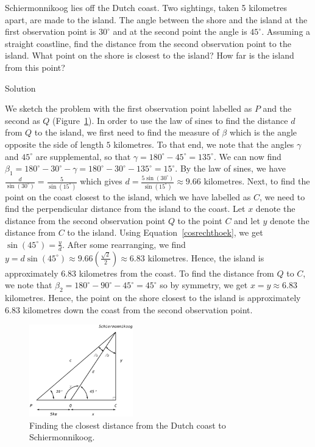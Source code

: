 \begin{example} \label{losapplication}

Schiermonnikoog lies off the Dutch coast.  Two sightings, taken 5 kilometres apart, are made to the island.  The angle between the shore and the island at the first observation point is $30^{\circ}$ and at the second point the angle is $45^{\circ}$.  Assuming a straight coastline, find the distance from the second observation point to the island.  What point on the shore is closest to the island? How far is the island from this point?  

Solution 


 We sketch the problem  with the first observation point labelled as $P$ and the second as $Q$ (Figure~\ref{fig_trans_20}). In order to use the law of sines to find the distance $d$ from $Q$ to the island, we first need to find the measure of $\beta$ which is the angle opposite the side of length $5$ kilometres.  To that end, we note that the angles $\gamma$ and $45^{\circ}$ are supplemental, so that $\gamma = 180^{\circ} - 45^{\circ} = 135^{\circ}$.  We can now find $\beta_1 = 180^{\circ} - 30^{\circ} - \gamma =  180^{\circ} - 30^{\circ} - 135^{\circ} = 15^{\circ}$. By the law of sines, we have $\frac{d}{\sin\left(30^{\circ}\right)} = \frac{5}{\sin\left(15^{\circ}\right)}$ which gives $d = \frac{5\sin\left(30^{\circ}\right)}{\sin\left(15^{\circ}\right)} \approx 9.66$ kilometres.  Next, to find the point on the coast closest to the island, which we have labelled as $C$, we need to find the perpendicular distance from the island to the coast. Let $x$ denote the distance from the second observation point $Q$ to the point $C$  and let $y$ denote the distance from $C$ to the island.  Using Equation~\eqref{cosrechthoek}, we get $\sin\left(45^{\circ}\right) = \frac{y}{d}$.  After some rearranging, we find $y = d \sin\left(45^{\circ}\right) \approx 9.66 \left(\frac{\sqrt{2}}{2}\right) \approx 6.83$ kilometres.  Hence, the island is approximately $6.83$ kilometres from the coast. To find the distance from $Q$ to $C$, we note that $\beta_2 = 180^{\circ} - 90^{\circ} - 45^{\circ} = 45^{\circ}$ so by symmetry, we get $x = y \approx 6.83$ kilometres.  Hence, the point on the shore closest to the island is approximately $6.83$ kilometres down the coast from the second observation point.

\begin{figure}[H]
	\begin{center}
			\includegraphics[width=0.4\textwidth]{fig_trans_20}
	\caption{Finding the closest distance from the Dutch coast to Schiermonnikoog. }
	\label{fig_trans_20}
	\end{center}
\end{figure}


\end{example}

